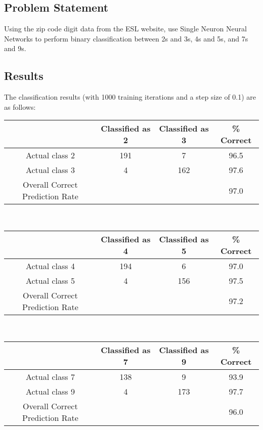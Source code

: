 \documentclass{article}
\begin{document}
\subsection{Problem Statement}
Using the zip code digit data from the ESL website, use Single Neuron Neural Networks to perform binary classification between 2s and 3s, 4s and 5s, and 7s and 9s.

\subsection{Results}
The classification results (with 1000 training iterations and a step size of 0.1) are as follows:\\
\begin{tabular}{| c || c | c | c |}
  \hline
                                  & Classified as 2 & Classified as 3 & \% Correct \\
  \hline
  Actual class 2                  & 191             & 7               & 96.5 \\
  \hline
  Actual class 3                  & 4               & 162             & 97.6 \\
  \hline
  \hline
  Overall Correct Prediction Rate &                 &                 & 97.0 \\
  \hline
\end{tabular}

\hfill\\%
\newline
\begin{tabular}{| c || c | c | c |}
  \hline
                                  & Classified as 4 & Classified as 5 & \% Correct \\
  \hline
  Actual class 4                  & 194             & 6               & 97.0 \\
  \hline
  Actual class 5                  & 4               & 156             & 97.5 \\
  \hline
  \hline
  Overall Correct Prediction Rate &                 &                 & 97.2 \\
  \hline
\end{tabular}

\hfill\\%
\newline
\begin{tabular}{| c || c | c | c |}
  \hline
                                  & Classified as 7 & Classified as 9 & \% Correct \\
  \hline
  Actual class 7                  & 138             & 9               & 93.9 \\
  \hline
  Actual class 9                  & 4               & 173             & 97.7 \\
  \hline
  \hline
  Overall Correct Prediction Rate &                 &                 & 96.0 \\
  \hline
\end{tabular}
\end{document}
